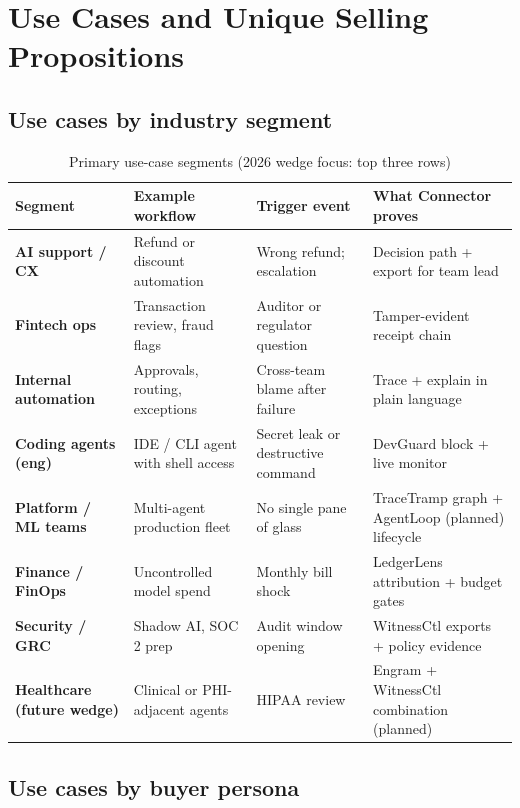 \chapter{Use Cases and Unique Selling Propositions}

\section{Use cases by industry segment}

\begin{table}[H]
\centering
\small
\renewcommand{\arraystretch}{1.35}
\begin{tabularx}{\textwidth}{@{}>{\bfseries}p{} p{} p{} X@{}}
\toprule
Segment & Example workflow & Trigger event & What Connector proves \\
\midrule
AI support / CX & Refund or discount automation & Wrong refund; escalation & Decision path + export for team lead \\
Fintech ops & Transaction review, fraud flags & Auditor or regulator question & Tamper-evident receipt chain \\
Internal automation & Approvals, routing, exceptions & Cross-team blame after failure & Trace + explain in plain language \\
Coding agents (eng) & IDE / CLI agent with shell access & Secret leak or destructive command & DevGuard block + live monitor \\
Platform / ML teams & Multi-agent production fleet & No single pane of glass & TraceTramp graph + AgentLoop (planned) lifecycle \\
Finance / FinOps & Uncontrolled model spend & Monthly bill shock & LedgerLens attribution + budget gates \\
Security / GRC & Shadow AI, SOC 2 prep & Audit window opening & WitnessCtl exports + policy evidence \\
Healthcare (future wedge) & Clinical or PHI-adjacent agents & HIPAA review & Engram + WitnessCtl combination (planned) \\
\bottomrule
\end{tabularx}
\caption{Primary use-case segments (2026 wedge focus: top three rows)}
\end{table}

\section{Use cases by buyer persona}

